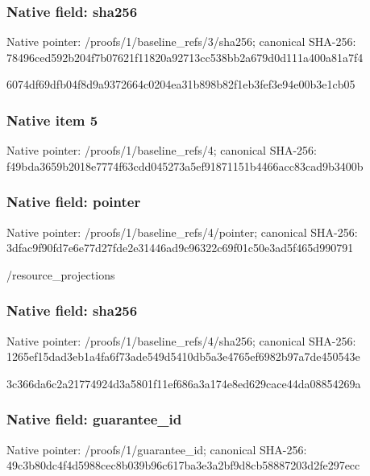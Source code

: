 \documentclass[10pt,a4paper]{article}
\begin{document}
\subsubsection{Native field: sha256}
Native pointer: /proofs/1/baseline\_\allowbreak{}refs/3/sha256; canonical SHA-256: 78496ced592b204f7b07621f11820a92713cc538bb2a679d0d111a400a81a7f4

\begingroup\raggedright\sloppy 6074df69dfb04f8d9a9372664c0204ea31b898b82f1eb3fef3e94e00b3e1cb05\par\endgroup

\subsubsection{Native item 5}
Native pointer: /proofs/1/baseline\_\allowbreak{}refs/4; canonical SHA-256: f49bda3659b2018e7774f63cdd045273a5ef91871151b4466acc83cad9b3400b

\subsubsection{Native field: pointer}
Native pointer: /proofs/1/baseline\_\allowbreak{}refs/4/pointer; canonical SHA-256: 3dfac9f90fd7e6e77d27fde2e31446ad9c96322c69f01c50e3ad5f465d990791

\begingroup\raggedright\sloppy /\allowbreak{}resource\_\allowbreak{}projections\par\endgroup

\subsubsection{Native field: sha256}
Native pointer: /proofs/1/baseline\_\allowbreak{}refs/4/sha256; canonical SHA-256: 1265ef15dad3eb1a4fa6f73ade549d5410db5a3e4765ef6982b97a7de450543e

\begingroup\raggedright\sloppy 3c366da6c2a21774924d3a5801f11ef686a3a174e8ed629cace44da08854269a\par\endgroup

\subsubsection{Native field: guarantee\_\allowbreak{}id}
Native pointer: /proofs/1/guarantee\_\allowbreak{}id; canonical SHA-256: 49c3b80dc4f4d5988cec8b039b96c617ba3e3a2bf9d8cb58887203d2fe297ecc
\end{document}
